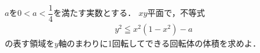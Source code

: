 \documentclass[../../main.tex]{subfiles}
\begin{document}
$a$を$\displaystyle 0<a<\dfrac{1}{4}$を満たす実数とする．
$xy$平面で，不等式
\begin{align*}
  y^2 \leqq x^2(1-x^2)-a
\end{align*}
の表す領域を$y$軸のまわりに1回転してできる回転体の体積を求めよ．
\end{document}
